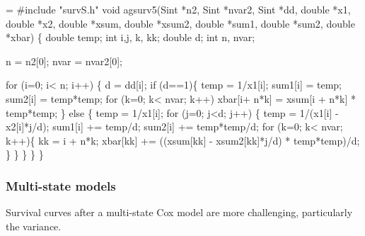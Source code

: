 \documentclass{article}
\begin{document}
\begin{nwchunk}
=
 #include "survS.h"
 void agsurv5(Sint *n2,     Sint *nvar2,  Sint *dd, double *x1,  
              double *x2,   double *xsum, double *xsum2, 
              double *sum1, double *sum2, double *xbar) \{
     double temp;
     int i,j, k, kk;
     double d;
     int n, nvar;
     
     n = n2[0];
     nvar = nvar2[0];
 
     for (i=0; i< n; i++) \{
         d = dd[i];
         if (d==1)\{
             temp = 1/x1[i];
             sum1[i] = temp;
             sum2[i] = temp*temp;
             for (k=0; k< nvar; k++) 
                 xbar[i+ n*k] = xsum[i + n*k] * temp*temp;
             \}
         else \{
             temp = 1/x1[i];
             for (j=0; j<d; j++) \{
                 temp = 1/(x1[i] - x2[i]*j/d);
                 sum1[i] += temp/d;
                 sum2[i] += temp*temp/d;
                 for (k=0; k< nvar; k++)\{
                     kk = i + n*k;
                     xbar[kk] += ((xsum[kk] - xsum2[kk]*j/d) * temp*temp)/d;
                     \}
                 \}
             \}
         \}
     \}
\end{nwchunk}

\subsubsection{Multi-state models}
Survival curves after a multi-state Cox model are more challenging,
particularly the variance.
\end{document}
